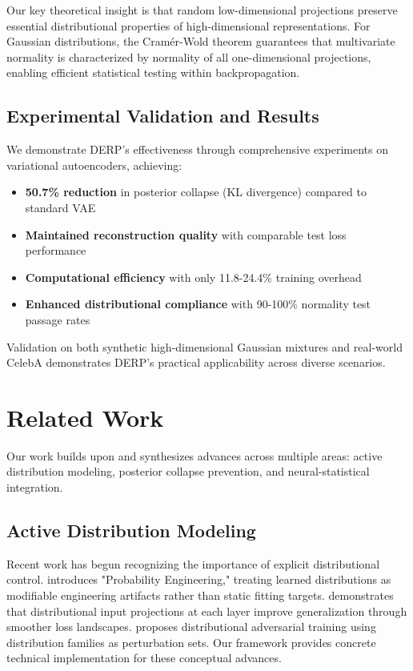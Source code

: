 \documentclass{article}
\begin{document}
Our key theoretical insight is that random low-dimensional projections preserve essential distributional properties of high-dimensional representations. For Gaussian distributions, the Cramér-Wold theorem guarantees that multivariate normality is characterized by normality of all one-dimensional projections, enabling efficient statistical testing within backpropagation.

\subsection{Experimental Validation and Results}

We demonstrate DERP's effectiveness through comprehensive experiments on variational autoencoders, achieving:

\begin{itemize}
\item \textbf{50.7\% reduction} in posterior collapse (KL divergence) compared to standard VAE
\item \textbf{Maintained reconstruction quality} with comparable test loss performance
\item \textbf{Computational efficiency} with only 11.8-24.4\% training overhead
\item \textbf{Enhanced distributional compliance} with 90-100\% normality test passage rates
\end{itemize}

Validation on both synthetic high-dimensional Gaussian mixtures and real-world CelebA demonstrates DERP's practical applicability across diverse scenarios.

\section{Related Work}

Our work builds upon and synthesizes advances across multiple areas: active distribution modeling, posterior collapse prevention, and neural-statistical integration.

\subsection{Active Distribution Modeling}

Recent work has begun recognizing the importance of explicit distributional control. \citet{zhang2025advancing} introduces "Probability Engineering," treating learned distributions as modifiable engineering artifacts rather than static fitting targets. \citet{hao2025towards} demonstrates that distributional input projections at each layer improve generalization through smoother loss landscapes. \citet{ahmadi2024distributional} proposes distributional adversarial training using distribution families as perturbation sets. Our framework provides concrete technical implementation for these conceptual advances.
\end{document}
